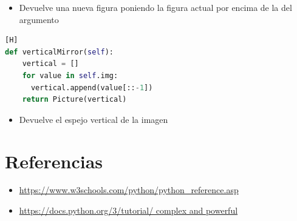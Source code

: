 \documentclass{article}
\begin{document}
	\begin{itemize}
		\item Devuelve una nueva figura poniendo la figura actual por encima de la del argumento
	\end{itemize}
	\begin{lstlisting}[language=Python,caption={Función VerticalMirror()}][H]
def verticalMirror(self):
    vertical = []
    for value in self.img:
      vertical.append(value[::-1])
    return Picture(vertical)
	\end{lstlisting}
	\begin{itemize}
		\item Devuelve el espejo vertical de la imagen 
	\end{itemize}



	
\section{Referencias}
\begin{itemize}			
	\item \url{https://www.w3schools.com/python/python_reference.asp}
	\item\url{https://docs.python.org/3/tutorial/ complex and powerful}
\end{itemize}	
	
%
%
%
			
\end{document}
